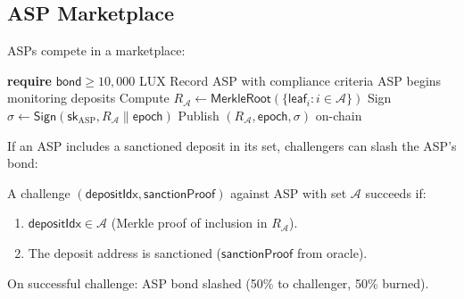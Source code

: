 \subsection{ASP Marketplace}

ASPs compete in a marketplace:

\begin{algorithm}[H]
\caption{ASP Registration and Set Publication}
\label{alg:asp}
\begin{algorithmic}[1]
    \State \textbf{require} $\mathsf{bond} \geq 10{,}000$ LUX
    \State Record ASP with compliance criteria
    \State ASP begins monitoring deposits
\EndProcedure
{}
    \State Compute $R_{\mathcal{A}} \gets \mathsf{MerkleRoot}(\{\mathsf{leaf}_i : i \in \mathcal{A}\})$
    \State Sign $\sigma \gets \mathsf{Sign}(\mathsf{sk}_{\text{ASP}}, R_{\mathcal{A}} \| \mathsf{epoch})$
    \State Publish $(R_{\mathcal{A}}, \mathsf{epoch}, \sigma)$ on-chain
\EndProcedure
\end{algorithmic}
\end{algorithm}

If an ASP includes a sanctioned deposit in its set, challengers can slash the ASP's bond:

\begin{definition}
A challenge $(\mathsf{depositIdx}, \mathsf{sanctionProof})$ against ASP with set $\mathcal{A}$ succeeds if:
\begin{enumerate}
    \item $\mathsf{depositIdx} \in \mathcal{A}$ (Merkle proof of inclusion in $R_{\mathcal{A}}$).
    \item The deposit address is sanctioned ($\mathsf{sanctionProof}$ from oracle).
\end{enumerate}
On successful challenge: ASP bond slashed (50\% to challenger, 50\% burned).
\end{definition}

